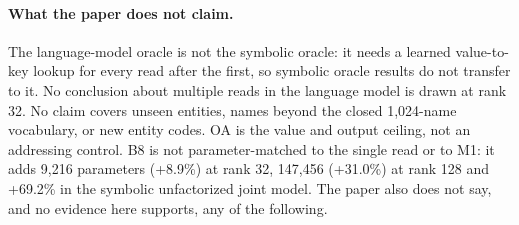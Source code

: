 \paragraph{What the paper does not claim.}
The language-model oracle is not the symbolic oracle: it needs a learned value-to-key lookup for every read after the first, so symbolic oracle results do not transfer to it.  %
No conclusion about multiple reads in the language model is drawn at rank 32.  %
No claim covers unseen entities, names beyond the closed 1,024-name vocabulary, or new entity codes.  %
OA is the value and output ceiling, not an addressing control.  %
B8 is not parameter-matched to the single read or to M1: it adds 9,216 parameters (+8.9\%) at rank 32, 147,456 (+31.0\%) at rank 128 and +69.2\% in the symbolic unfactorized joint model.  %
The paper also does not say, and no evidence here supports, any of the following.
